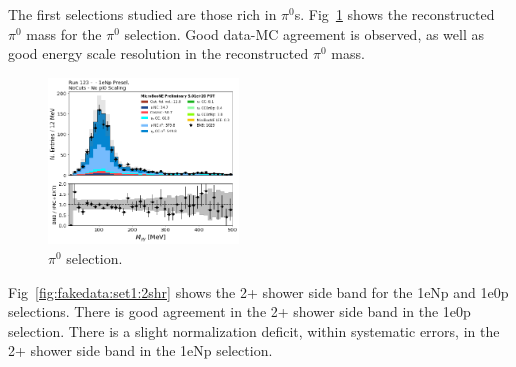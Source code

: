 The first selections studied are those rich in $\pi^{0}$s. Fig~\ref{fig:fakedata:set1:pi0} shows the reconstructed $\pi^{0}$ mass for the $\pi^{0}$ selection. Good data-MC agreement is observed, as well as good energy scale resolution in the reconstructed $\pi^{0}$ mass. 
\begin{figure}[H]
\begin{center}
\includegraphics[width=0.45\textwidth]{Fakedata/set1/pi0.pdf}
\caption{\label{fig:fakedata:set1:pi0} $\pi^{0}$ selection.}
\end{center}
\end{figure}

Fig~\ref{fig:fakedata:set1:2shr} shows the 2+ shower side band for the 1eNp and 1e0p selections. There is good agreement in the 2+ shower side band in the 1e0p selection.  There is a slight normalization deficit, within systematic errors, in the 2+ shower side band in the 1eNp selection. 

